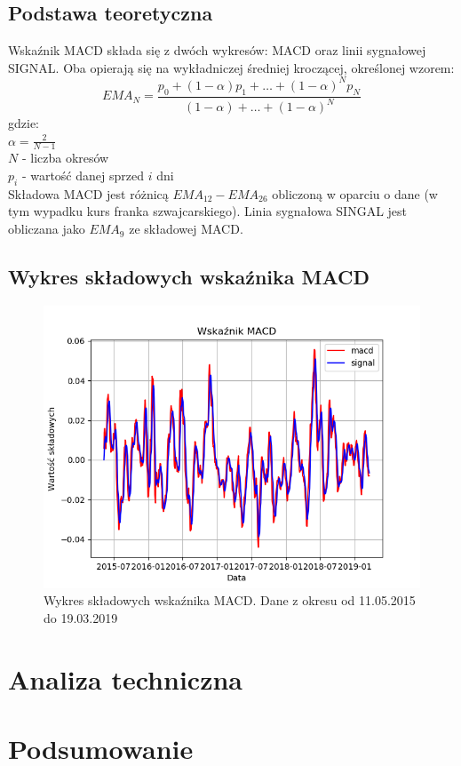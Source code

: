 \documentclass{article} %
\begin{document}
\subsection{Podstawa teoretyczna}
Wskaźnik MACD składa się z dwóch wykresów: MACD oraz linii sygnałowej SIGNAL. 
Oba opierają się na wykładniczej średniej kroczącej, określonej wzorem: \\
\begin{equation}
    EMA_{N} = \frac{p_{0} + (1-\alpha)p_{1} + \dots + (1-\alpha)^N p_{N}}{(1-\alpha) + \dots + (1-\alpha)^N}
\end{equation}
gdzie: \\ \newline
$ \alpha = \frac{2}{N - 1} $ \\
$ N $ - liczba okresów \\
$ p_{i} $ - wartość danej sprzed $ i $ dni \\


Składowa MACD jest różnicą $ EMA_{12} - EMA_{26} $ obliczoną w oparciu o dane (w tym wypadku kurs franka szwajcarskiego). 
Linia sygnałowa SINGAL jest obliczana jako $ EMA_{9} $ ze składowej MACD.

\subsection{Wykres składowych wskaźnika MACD}

\begin{figure}[h]
    \centering
    \includegraphics[scale=0.7]{images/wykres_macd.png}
    \caption{Wykres składowych wskaźnika MACD. Dane z okresu od 11.05.2015 do 19.03.2019}
\end{figure}

\newpage

\section{Analiza techniczna}


\newpage
\section{Podsumowanie}
\end{document}
